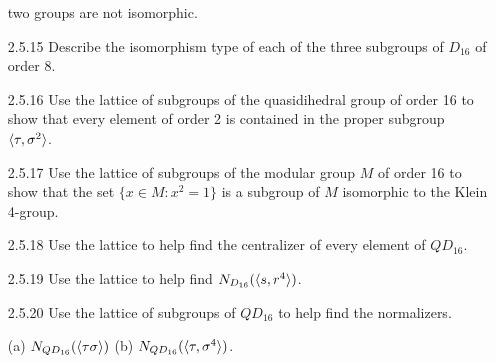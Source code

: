 \begin{enumerate}
                  two groups are not isomorphic.
   \item[2.5.15]  Describe the isomorphism type of each of the three subgroups
                  of $D_{16}$ of order 8.
   \item[2.5.16]  Use the lattice of subgroups of the quasidihedral group of
                  order 16 to show that every element of order 2 is contained in
                  the proper subgroup $\langle \tau, \sigma^2 \rangle$.
   \item[2.5.17]  Use the lattice of subgroups of the modular group $M$ of order
                  16 to show that the set $\{x \in M : x^2 = 1\}$ is a subgroup
                  of $M$ isomorphic to the Klein 4-group.
   \item[2.5.18]  Use the lattice to help find the centralizer of every element
                  of $QD_{16}$.
   \item[2.5.19]  Use the lattice to help find $N_{D_{16}}(\langle s, r^4 \rangle)$.
   \item[2.5.20]  Use the lattice of subgroups of $QD_{16}$ to help find the
                  normalizers.

                  (a) $N_{QD_{16}}(\langle \tau\sigma \rangle)$ \qquad
                  (b) $N_{QD_{16}}(\langle \tau, \sigma^4 \rangle)$.
\end{enumerate}

